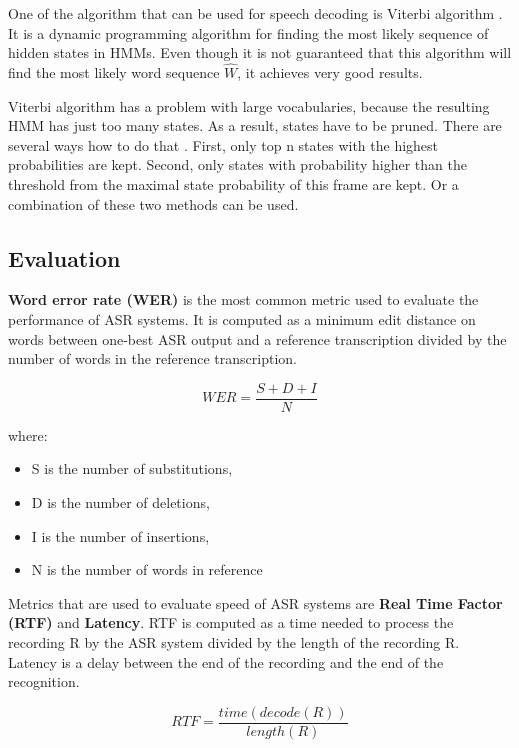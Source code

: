 One of the algorithm that can be used for speech decoding is Viterbi algorithm \cite{forney1973viterbi}.
It is a dynamic programming algorithm for finding the most likely sequence of hidden states in HMMs.
Even though it is not guaranteed that this algorithm will find the most likely word sequence $\widehat{W}$,
  it achieves very good results.

Viterbi algorithm has a problem with large vocabularies,
  because the resulting HMM has just too many states.
As a result, states have to be pruned.
There are several ways how to do that \cite{jang2002optimization}.
First, only top n states with the highest probabilities are kept.
Second, only states with probability higher than the threshold from the maximal state probability of this frame are kept.
Or a combination of these two methods can be used.


\subsection{Evaluation}
\textbf{Word error rate (WER)} is the most common metric used to evaluate the performance of ASR systems.
It is computed as a minimum edit distance on words between one-best ASR output and a reference transcription divided by the number of words in the reference transcription.

\begin{equation}
  WER = \frac{S + D + I}{N}
\end{equation}

where:
\begin{itemize}
  \item S is the number of substitutions,
  \item D is the number of deletions,
  \item I is the number of insertions,
  \item N is the number of words in reference
\end{itemize}

Metrics that are used to evaluate speed of ASR systems are \textbf{Real Time Factor (RTF)} and \textbf{Latency}.
RTF is computed as a time needed to process the recording R by the ASR system divided by the length of the recording R.
Latency is a delay between the end of the recording and the end of the recognition.

\begin{equation}
  RTF = \frac{time(decode(R))}{length(R)}
\end{equation}


